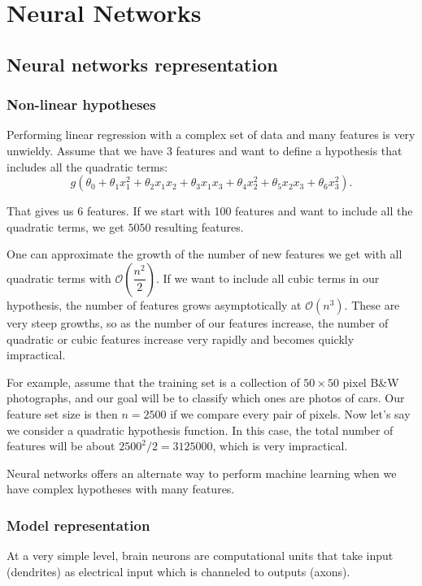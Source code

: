 \documentclass[a4paper,11pt]{report}
\begin{document}
\chapter{Neural Networks}

\section{Neural networks representation}

\subsection*{Non-linear hypotheses}

Performing linear regression with a complex set of data and many features is very unwieldy. Assume that we have 3 features and want to define a hypothesis that includes all the quadratic terms:
$$g(\theta_0 + \theta_1x_1^2 + \theta_2x_1x_2 + \theta_3x_1x_3 + \theta_4x_2^2 + \theta_5x_2x_3 + \theta_6x_3^2).$$

That gives us 6 features. If we start with 100 features and want to include all the quadratic terms, we get $5050$ resulting features.

One can approximate the growth of the number of new features we get with all quadratic terms with $\mathcal{O}(\dfrac{n^2}{2})$. If we want to include all cubic terms in our hypothesis, the number of features grows asymptotically at $\mathcal{O}(n^3)$. These are very steep growths, so as the number of our features increase, the number of quadratic or cubic features increase very rapidly and becomes quickly impractical.

For example, assume that the training set is a collection of $50 \times 50$ pixel B\&W photographs, and our goal will be to classify which ones are photos of cars. Our feature set size is then $n = 2500$ if we compare every pair of pixels. Now let's say we consider a quadratic hypothesis function. In this case, the total number of features will be about $2500^2 / 2 = 3125000$, which is very impractical.

Neural networks offers an alternate way to perform machine learning when we have complex hypotheses with many features.

\subsection*{Model representation}

At a very simple level, brain neurons are computational units that take input (dendrites) as electrical input which is channeled to outputs (axons).
\end{document}
